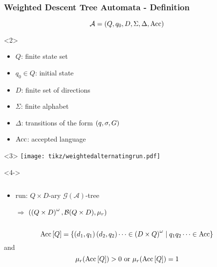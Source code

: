 \documentclass{beamer}
\begin{document}
  \begin{frame}
    \frametitle{Weighted Descent Tree Automata - Definition}
    \begin{equation*}
      \mathcal{A} = \left(Q, q_{0}, D, \Sigma, \Delta, \operatorname{Acc}\right) 
    \end{equation*}
    \begin{overlayarea}{\textwidth}{0.8\textheight}
      \begin{onlyenv}<2>
        \begin{itemize}
          \item $Q$: finite state set
          \item $q_{0}\in Q$: initial state
          \item $D$: finite set of directions
          \item $\Sigma$: finite alphabet
          \item $\Delta$: transitions of the form $\left(q, \sigma, G\right)$
          \item $\operatorname{Acc}$: accepted language
        \end{itemize}
      \end{onlyenv}
      \begin{onlyenv}<3>
        \texttt{[image: tikz/weightedalternatingrun.pdf]}
      \end{onlyenv}
      \begin{onlyenv}<4->
        \begin{columns}
          \begin{column}{0.5\textwidth}
            \begin{itemize}
              \item run: $Q\times D$-ary 
                $\mathcal{G}(\mathcal{A})$-tree
              \item[$\Rightarrow$] $\left(\left(Q\times D\right)^{\omega}, 
                \mathcal{B}(Q\times D), \mu_{r}\right)$
            \end{itemize}
          \end{column}
          \begin{column}{0.5\textwidth}
          \end{column}
        \end{columns}
        \begin{equation*}
          \operatorname{Acc}\left[Q\right] = \left\{
            \left(d_{1}, q_{1}\right)\left(d_{2}, q_{2}\right)\dots\in
            \left(D\times Q\right)^{\omega}\mid q_{1}q_{2}\dots\in\operatorname{Acc}
          \right\}
        \end{equation*}
        and
        \begin{equation*}
          \mu_{r}(\operatorname{Acc}\left[Q\right]) > 0\text{ or }\mu_{r}(\operatorname{Acc}\left[Q\right]) = 1
        \end{equation*}
      \end{onlyenv}
    \end{overlayarea}
  \end{frame}
\end{document}

